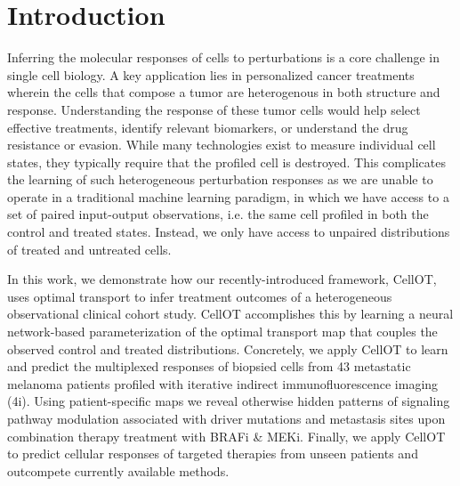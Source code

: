 \section{Introduction}
Inferring the molecular responses of cells to perturbations is a core challenge in single cell biology.
A key application lies in personalized cancer treatments wherein the cells that compose a tumor are heterogenous in both structure and response.
Understanding the response of these tumor cells would help select effective treatments, identify relevant biomarkers, or understand the drug resistance or evasion.
While many technologies exist to measure individual cell states, they typically require that the profiled cell is destroyed.
This complicates the learning of such heterogeneous perturbation responses as we are unable to operate in a traditional machine learning paradigm, in which we have access to a set of paired input-output observations, i.e.
the same cell profiled in both the control and treated states.
Instead, we only have access to unpaired distributions of treated and untreated cells.

In this work, we demonstrate how our recently-introduced framework, CellOT, uses optimal transport to infer treatment outcomes of a heterogeneous observational clinical cohort study.
CellOT accomplishes this by learning a neural network-based parameterization of the optimal transport map that couples the observed control and treated distributions.
Concretely, we apply CellOT to learn and predict the multiplexed responses of biopsied cells from 43 metastatic melanoma patients profiled with iterative indirect immunofluorescence imaging (4i).
Using patient-specific maps we reveal otherwise hidden patterns of signaling pathway modulation associated with driver mutations and metastasis sites upon combination therapy treatment with BRAFi & MEKi.
Finally, we apply CellOT to predict cellular responses of targeted therapies from unseen patients and outcompete currently available methods.

